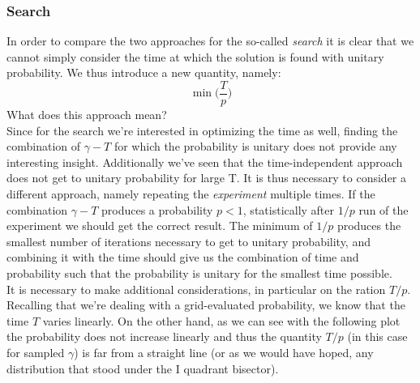 \documentclass[11pt, twoside]{report}
\begin{document}
\subsubsection*{Search}
In order to compare the two approaches for the so-called \textit{search} it is clear that we cannot simply consider the time at which the solution is found with unitary probability. We thus introduce a new quantity, namely:
  \begin{equation}
    \min\Big(\frac{T}{p}\Big)
  \end{equation}
What does this approach mean? \\
Since for the search we're interested in optimizing the time as well, finding the combination of $\gamma-T$ for which the probability is unitary does not provide any interesting insight. Additionally we've seen that the time-independent approach does not get to unitary probability for large T. It is thus necessary to consider a different approach, namely repeating the \textit{experiment} multiple times. If the combination $\gamma-T$ produces a probability $p<1$, statistically after $1/p$ run of the experiment we should get the correct result. The minimum of $1/p$ produces the smallest number of iterations necessary to get to unitary probability, and combining it with the time should give us the combination of time and probability such that the probability is unitary for the smallest time possible.\\


It is necessary to make additional considerations, in particular on the ration $T/p$. Recalling that we're dealing with a grid-evaluated probability, we know that the time $T$ varies linearly. On the other hand, as we can see with the following plot the probability does not increase linearly and thus the quantity $T/p$ (in this case for sampled $\gamma$) is far from a straight line (or as we would have hoped, any distribution that stood under the I quadrant bisector).
\end{document}
